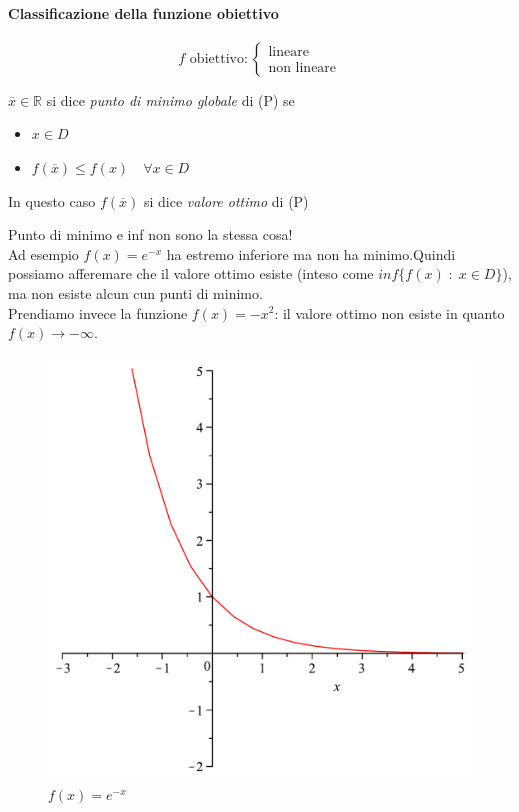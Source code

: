 \paragraph{Classificazione della funzione obiettivo}
$$f \text{ obiettivo}: \left\{
\begin{array}{l}
 \text{lineare} \\
 \text{non lineare}
\end{array}
\right.
$$
\begin{defn}
$\overline{x} \in \mathbb{R}$ si dice 
\emph{punto di minimo globale} di (P) se
\begin{itemize}
\item $x \in D$
\item $f(\overline{x}) \leq f(x) \quad
\forall x \in D$
\end{itemize}
\end{defn}
In questo caso $f(\overline{x})$ si dice
\emph{valore ottimo} di (P)
\begin{observation}
 Punto di minimo e inf non sono la stessa cosa! \\

 Ad esempio $f(x) = e^{-x}$ ha estremo inferiore ma 
non ha minimo.Quindi possiamo afferemare che il valore
ottimo esiste (inteso come $inf\{f(x)\; : \; x \in D \}$),
ma non esiste alcun cun punti di minimo. \\
Prendiamo invece la funzione
$f(x) = -x^{2}$: il valore ottimo non esiste in quanto
$f(x) \rightarrow -\infty$.
\end{observation}
\begin{figure}[h]
  \centerline{\includegraphics[scale=0.3]{imgs/fun01.pdf}}
  \label{fig:theFig}
  \caption{$f(x) = e^{-x}$}
\end{figure}

